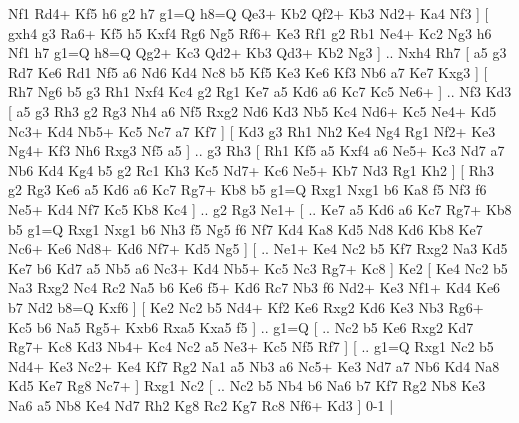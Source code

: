 Nf1  Rd4+ Kf5  h6 g2  h7 g1=Q  h8=Q Qe3+  Kb2 Qf2+  Kb3 Nd2+  Ka4 Nf3   ]  [  gxh4 g3  Ra6+ Kf5  h5 Kxf4  Rg6 Ng5  Rf6+ Ke3  Rf1 g2  Rb1 Ne4+  Kc2 Ng3  h6 Nf1  h7 g1=Q  h8=Q Qg2+  Kc3 Qd2+  Kb3 Qd3+  Kb2 Ng3   ] .. Nxh4    Rh7 [  a5 g3  Rd7 Ke6  Rd1 Nf5  a6 Nd6  Kd4 Nc8  b5 Kf5  Ke3 Ke6  Kf3 Nb6  a7 Ke7  Kxg3   ]  [  Rh7 Ng6  b5 g3  Rh1 Nxf4  Kc4 g2  Rg1 Ke7  a5 Kd6  a6 Kc7  Kc5 Ne6+   ] .. Nf3    Kd3 [  a5 g3  Rh3 g2  Rg3 Nh4  a6 Nf5  Rxg2 Nd6  Kd3 Nb5  Kc4 Nd6+  Kc5 Ne4+  Kd5 Nc3+  Kd4 Nb5+  Kc5 Nc7  a7 Kf7   ]  [  Kd3 g3  Rh1 Nh2  Ke4 Ng4  Rg1 Nf2+  Ke3 Ng4+  Kf3 Nh6  Rxg3 Nf5  a5   ] .. g3    Rh3 [  Rh1 Kf5  a5 Kxf4  a6 Ne5+  Kc3 Nd7  a7 Nb6  Kd4 Kg4  b5 g2  Rc1 Kh3  Kc5 Nd7+  Kc6 Ne5+  Kb7 Nd3  Rg1 Kh2   ]  [  Rh3 g2  Rg3 Ke6  a5 Kd6  a6 Kc7  Rg7+ Kb8  b5 g1=Q  Rxg1 Nxg1  b6 Ka8  f5 Nf3  f6 Ne5+  Kd4 Nf7  Kc5 Kb8  Kc4   ] .. g2    Rg3   Ne1+ [ .. Ke7  a5 Kd6  a6 Kc7  Rg7+ Kb8  b5 g1=Q  Rxg1 Nxg1  b6 Nh3  f5 Ng5  f6 Nf7  Kd4 Ka8  Kd5 Nd8  Kd6 Kb8  Ke7 Nc6+  Ke6 Nd8+  Kd6 Nf7+  Kd5 Ng5   ]  [ .. Ne1+  Ke4 Nc2  b5 Kf7  Rxg2 Na3  Kd5 Ke7  b6 Kd7  a5 Nb5  a6 Nc3+  Kd4 Nb5+  Kc5 Nc3  Rg7+ Kc8   ]  Ke2 [  Ke4 Nc2  b5 Na3  Rxg2 Nc4  Rc2 Na5  b6 Ke6  f5+ Kd6  Rc7 Nb3  f6 Nd2+  Ke3 Nf1+  Kd4 Ke6  b7 Nd2  b8=Q Kxf6   ]  [  Ke2 Nc2  b5 Nd4+  Kf2 Ke6  Rxg2 Kd6  Ke3 Nb3  Rg6+ Kc5  b6 Na5  Rg5+ Kxb6  Rxa5 Kxa5  f5   ] .. g1=Q [ .. Nc2  b5 Ke6  Rxg2 Kd7  Rg7+ Kc8  Kd3 Nb4+  Kc4 Nc2  a5 Ne3+  Kc5 Nf5  Rf7   ]  [ .. g1=Q  Rxg1 Nc2  b5 Nd4+  Ke3 Nc2+  Ke4 Kf7  Rg2 Na1  a5 Nb3  a6 Nc5+  Ke3 Nd7  a7 Nb6  Kd4 Na8  Kd5 Ke7  Rg8 Nc7+   ]  Rxg1   Nc2    [ .. Nc2  b5 Nb4  b6 Na6  b7 Kf7  Rg2 Nb8  Ke3 Na6  a5 Nb8  Ke4 Nd7  Rh2 Kg8  Rc2 Kg7  Rc8 Nf6+  Kd3   ] 0-1  |
